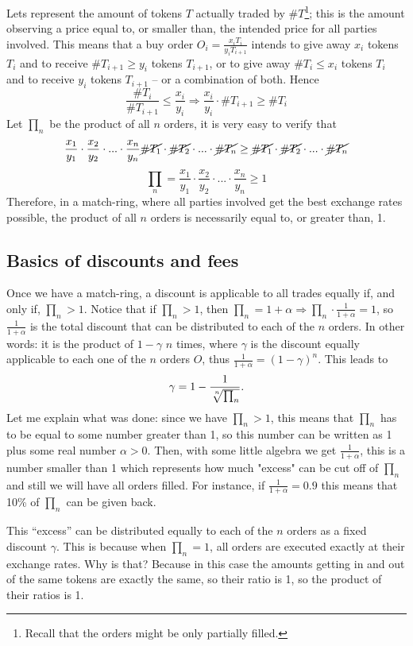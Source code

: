 \documentclass{article}
\theoremstyle{remark}
\theoremstyle{definition}
\begin{document}
Lets represent the amount of tokens $T$ actually traded by $\#T$\footnote{Recall that the orders might be only partially filled.}; this is the amount observing a price equal to, or smaller than, the intended price for all parties involved. This means that a buy order $O_i=\frac{x_iT_i}{y_iT_{i+1}}$ intends to give away $x_i$ tokens $T_i$ and to receive $\#T_{i+1}\geq y_i$ tokens $T_{i+1}$, or to give away $\#T_{i}\leq x_i$ tokens $T_i$ and to receive $y_i$ tokens $T_{i+1}$ -- or a combination of both. Hence
$$
\frac{\#T_{i}}{\#T_{i+1}}\leq\frac{x_i}{y_i}\Longrightarrow\frac{x_i}{y_i}\cdot\#T_{i+1}\geq\#T_{i}
$$
%
Let $\prod_n$ be the product of all $n$ orders, it is very easy to verify that
$$
\frac{x_1}{y_1}\cdot\frac{x_2}{y_2}\cdot...\cdot\frac{x_n}{y_n}\cancel{\#T_{1}}\cdot\cancel{\#T_{2}}\cdot...\cdot\cancel{\#T_{n}}\geq\cancel{\#T_{1}}\cdot\cancel{\#T_{2}}\cdot...\cdot\cancel{\#T_{n}}
$$
$$
\prod_n=\frac{x_1}{y_1}\cdot\frac{x_2}{y_2}\cdot...\cdot\frac{x_n}{y_n}\geq1
$$
Therefore, in a match-ring, where all parties involved get the best exchange rates possible, the product of all $n$ orders is necessarily equal to, or greater than, 1.

\subsection{Basics of discounts and fees}\label{sect:subsect2}

Once we have a match-ring, a discount is applicable to all trades equally if, and only if, $\prod_n>1$. Notice that if $\prod_n>1$, then $\prod_n=1+\alpha\Longrightarrow\prod_n\cdot\frac{1}{1+\alpha}=1$, so $\frac{1}{1+\alpha}$ is the total discount that can be distributed to each of the $n$ orders. In other words: it is the product of $1-\gamma$ $n$ times, where $\gamma$ is the discount equally applicable to each one of the $n$ orders $O$, thus $\frac{1}{1+\alpha}=(1-\gamma)^n$. This leads to
$$
\gamma=1-\frac{1}{\sqrt[\leftroot{-2}\uproot{2}n]{\prod_n}}.
$$
Let me explain what was done: since we have $\prod_n>1$, this means that $\prod_n$ has to be equal to some number greater than 1, so this number can be written as 1 plus some real number $\alpha>0$. Then, with some little algebra we get $\frac{1}{1+\alpha}$, this is a number smaller than 1 which represents how much "excess" can be cut off of $\prod_n$ and still we will have all orders filled. For instance, if $\frac{1}{1+\alpha}=0.9$ this means that 10\% of $\prod_n$ can be given back.

This ``excess'' can be distributed equally to each of the $n$ orders as a fixed discount $\gamma$. This is because when $\prod_n=1$, all orders are executed exactly at their exchange rates. Why is that? Because in this case the amounts getting in and out of the same tokens are exactly the same, so their ratio is 1, so the product of their ratios is 1.
\end{document}
